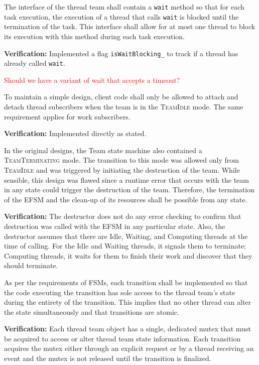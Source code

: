 \documentclass{article}
\newcommand{\TeamIdle}          {\textsc{TeamIdle}}
\newcommand{\TeamTerminating}   {\textsc{TeamTerminating}}
\begin{document}
\begin{spec}
\label{spec:Runtime_OneWait}
The interface of the thread team shall contain a \texttt{wait} method so that
for each task execution, the execution of a thread that calls \texttt{wait} is
blocked until the termination of the task.  This interface shall allow for at
most one thread to block its execution with this method during each task
execution.
\end{spec}
\textbf{Verification:}\hspace{0.125in}  Implemented a flag
\texttt{isWaitBlocking\_} to track if a thread has already called \texttt{wait}.

\textcolor{red}{Should we have a variant of wait that accepts a timeout?}

\begin{spec}
To maintain a simple design, client code shall only be allowed to attach and
detach thread subscribers when the team is in the {\TeamIdle} mode.  The same
requirement applies for work subscribers.
\end{spec}
\textbf{Verification:}\hspace{0.125in} Implemented directly as stated.

\begin{spec}
In the original designs, the Team state machine also contained a
{\TeamTerminating} mode.  The transition to this mode was allowed only from
{\TeamIdle} and was triggered by initiating the destruction of the team.  While
sensible, this design was flawed since a runtime error that occurs with the team
in any state could trigger the destruction of the team.  Therefore, the
termination of the EFSM and the clean-up of its resources shall be possible from
any state.
\end{spec}
\textbf{Verification:}\hspace{0.125in}  The destructor does not do any error
checking to confirm that destruction was called with the EFSM in any particular
state.  Also, the destructor assumes that there are Idle, Waiting, and Computing
threads at the time of calling.  For the Idle and Waiting threads, it signals 
them to terminate; Computing threads, it waits for them to finish their work and
discover that they should terminate.

\begin{spec}
\label{spec:Runtime_AtomicTransition}
As per the requirements of FSMs, each transition shall be implemented so that
the code executing the transition has sole access to the thread team's state
during the entirety of the transition.  This implies that no other thread can
alter the state simultaneously and that transitions are atomic.
\end{spec}
\textbf{Verification:}\hspace{0.125in}  Each thread team object has a single,
dedicated mutex that must be acquired to access or alter thread team state
information.  Each transition acquires the mutex either through an explicit
request or by a thread receiving an event and the mutex is not released until
the transition is finalized.\\
\end{document}
